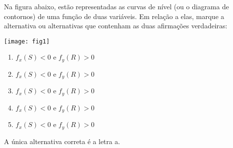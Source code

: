 \item Na figura abaixo, estão representadas as curvas de nível (ou o diagrama de
contornos) de uma função de duas variáveis. Em relação a elas, marque a alternativa ou
alternativas que contenham as duas afirmações verdadeiras: 

\begin{center}
	\texttt{[image: fig1]}
\end{center}

\begin{enumerate}
	\item $f_x(S) < 0$ e $f_y(R) > 0$
	\item $f_x(S) < 0$ e $f_y(R) > 0$
	\item $f_x(S) < 0$ e $f_y(R) > 0$
	\item $f_x(S) < 0$ e $f_y(R) > 0$
	\item $f_x(S) < 0$ e $f_y(R) > 0$
\end{enumerate}

\solucao

A única alternativa correta é a letra a.
